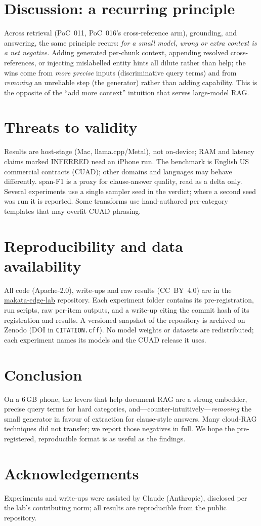 \documentclass[11pt]{article}
\newcommand{\poc}[1]{PoC~#1}
\newcommand{\repo}{\href{https://github.com/ralph-mattew/makata-edge-lab}{makata-edge-lab}}
\begin{document}
\section{Discussion: a recurring principle}
Across retrieval (\poc{011}, \poc{016}'s cross-reference arm), grounding, and answering, the
same principle recurs: \emph{for a small model, wrong or extra context is a net negative.}
Adding generated per-chunk context, appending resolved cross-references, or injecting
mislabelled entity hints all dilute rather than help; the wins come from \emph{more precise}
inputs (discriminative query terms) and from \emph{removing} an unreliable step (the generator)
rather than adding capability. This is the opposite of the ``add more context'' intuition that
serves large-model RAG.

\section{Threats to validity}
Results are host-stage (Mac, llama.cpp/Metal), not on-device; RAM and latency claims marked
INFERRED need an iPhone run. The benchmark is English US commercial contracts (CUAD); other
domains and languages may behave differently. span-F1 is a proxy for clause-answer quality, read
as a delta only. Several experiments use a single sampler seed in the verdict; where a second
seed was run it is reported. Some transforms use hand-authored per-category templates that may
overfit CUAD phrasing.

\section{Reproducibility and data availability}\label{sec:repro}
All code (Apache-2.0), write-ups and raw results (CC~BY~4.0) are in the \repo{} repository.
Each experiment folder contains its pre-registration, run scripts, raw per-item outputs, and a
write-up citing the commit hash of its registration and results. A versioned snapshot of the
repository is archived on Zenodo (DOI in \texttt{CITATION.cff}). No model weights or datasets
are redistributed; each experiment names its models and the CUAD release it uses.

\section{Conclusion}
On a 6\,GB phone, the levers that help document RAG are a strong embedder, precise query terms
for hard categories, and---counter-intuitively---\emph{removing} the small generator in favour
of extraction for clause-style answers. Many cloud-RAG techniques did not transfer; we report
those negatives in full. We hope the pre-registered, reproducible format is as useful as the
findings.

\section*{Acknowledgements}
Experiments and write-ups were assisted by Claude (Anthropic), disclosed per the lab's
contributing norm; all results are reproducible from the public repository.



\end{document}
